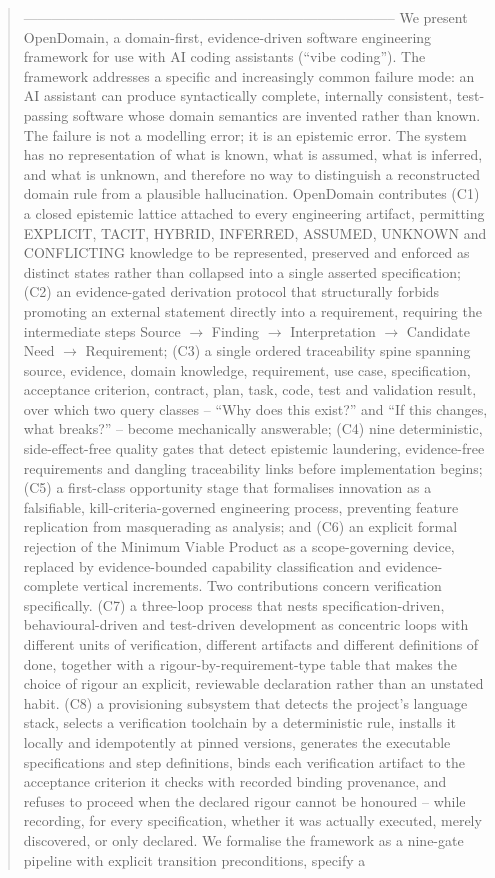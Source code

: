 \documentclass[11pt,a4paper]{article}
\begin{document}
\begin{abstract}
-------------------------------------------------------------------------------- We present OpenDomain, a domain-first, evidence-driven software engineering framework for use with AI coding assistants (``vibe coding''). The framework addresses a specific and increasingly common failure mode: an AI assistant can produce syntactically complete, internally consistent, test-passing software whose domain semantics are invented rather than known. The failure is not a modelling error; it is an epistemic error. The system has no representation of what is known, what is assumed, what is inferred, and what is unknown, and therefore no way to distinguish a reconstructed domain rule from a plausible hallucination. OpenDomain contributes (C1) a closed epistemic lattice attached to every engineering artifact, permitting EXPLICIT, TACIT, HYBRID, INFERRED, ASSUMED, UNKNOWN and CONFLICTING knowledge to be represented, preserved and enforced as distinct states rather than collapsed into a single asserted specification; (C2) an evidence-gated derivation protocol that structurally forbids promoting an external statement directly into a requirement, requiring the intermediate steps Source $\rightarrow$ Finding $\rightarrow$ Interpretation $\rightarrow$ Candidate Need $\rightarrow$ Requirement; (C3) a single ordered traceability spine spanning source, evidence, domain knowledge, requirement, use case, specification, acceptance criterion, contract, plan, task, code, test and validation result, over which two query classes -- ``Why does this exist?'' and ``If this changes, what breaks?'' -- become mechanically answerable; (C4) nine deterministic, side-effect-free quality gates that detect epistemic laundering, evidence-free requirements and dangling traceability links before implementation begins; (C5) a first-class opportunity stage that formalises innovation as a falsifiable, kill-criteria-governed engineering process, preventing feature replication from masquerading as analysis; and (C6) an explicit formal rejection of the Minimum Viable Product as a scope-governing device, replaced by evidence-bounded capability classification and evidence-complete vertical increments. Two contributions concern verification specifically. (C7) a three-loop process that nests specification-driven, behavioural-driven and test-driven development as concentric loops with different units of verification, different artifacts and different definitions of done, together with a rigour-by-requirement-type table that makes the choice of rigour an explicit, reviewable declaration rather than an unstated habit. (C8) a provisioning subsystem that detects the project's language stack, selects a verification toolchain by a deterministic rule, installs it locally and idempotently at pinned versions, generates the executable specifications and step definitions, binds each verification artifact to the acceptance criterion it checks with recorded binding provenance, and refuses to proceed when the declared rigour cannot be honoured -- while recording, for every specification, whether it was actually executed, merely discovered, or only declared. We formalise the framework as a nine-gate pipeline with explicit transition preconditions, specify a 
\end{abstract}
\end{document}
